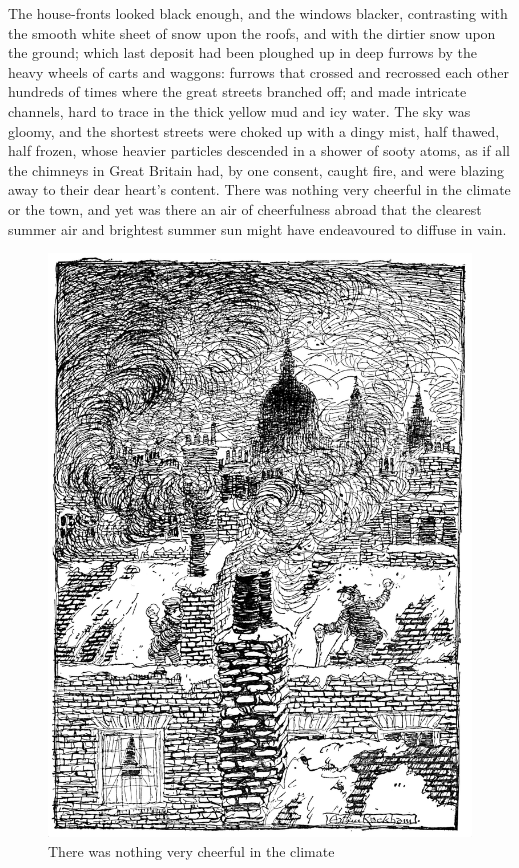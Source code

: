 \documentclass[paper=5.5in:8.5in,BCOR=10mm,twoside,DIV=15,12pt,usegeometry,openany]{scrbook} %
\begin{document}
The house-fronts looked black enough, and the windows blacker, contrasting with the smooth white sheet of snow upon the roofs, and with the dirtier snow upon the ground; which last deposit had been ploughed up in deep furrows by the heavy wheels of carts and waggons: furrows that crossed and recrossed each other hundreds of times where the great streets branched off; and made intricate channels, hard to trace in the thick yellow mud and icy water. The sky was gloomy, and the shortest streets were choked up with a dingy mist, half thawed, half frozen, whose heavier particles descended in a shower of sooty atoms, as if all the chimneys in Great Britain had, by one consent, caught fire, and were blazing away to their dear heart's content. There was nothing very cheerful in the climate or the town, and yet was there an air of cheerfulness abroad that the clearest summer air and brightest summer sun might have endeavoured to diffuse in vain.

\begin{figure}
\begin{minipage}[c]{\linewidth}
\includegraphics[width=\linewidth]{climate}
\caption*{There was nothing very cheerful in the climate}
\end{minipage}
\end{figure}
\end{document}
